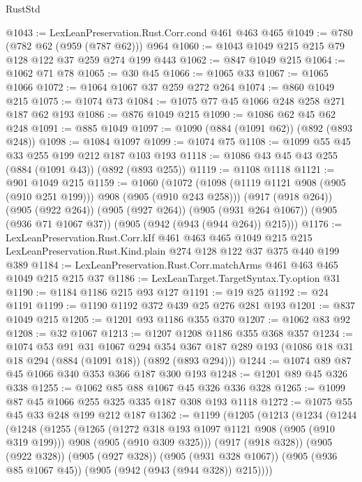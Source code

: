 \begin{lexlean}{RustStd}
\begin{coremodule}
@1043 := LexLeanPreservation.Rust.Corr.cond @461 @463 @465
@1049 := @780 (@782 @62 (@959 (@787 @62))) @964
@1060 := @1043 @1049 @215 @215 @79 @128 @122 @37 @259 @274 @199 @443
@1062 := @847 @1049 @215
@1064 := @1062 @71 @78
@1065 := @30 @45
@1066 := @1065 @33
@1067 := @1065 @1066
@1072 := @1064 @1067 @37 @259 @272 @264
@1074 := @860 @1049 @215
@1075 := @1074 @73
@1084 := @1075 @77 @45 @1066 @248 @258 @271 @187 @62 @193
@1086 := @876 @1049 @215
@1090 := @1086 @62 @45 @62 @248
@1091 := @885 @1049
@1097 := @1090 (@884 (@1091 @62)) (@892 (@893 @248))
@1098 := @1084 @1097
@1099 := @1074 @75
@1108 := @1099 @55 @45 @33 @255 @199 @212 @187 @103 @193
@1118 := @1086 @43 @45 @43 @255 (@884 (@1091 @43)) (@892 (@893 @255))
@1119 := @1108 @1118
@1121 := @901 @1049 @215
@1159 := @1060
    (@1072
      (@1098 (@1119 @1121 @908 (@905 (@910 @251 @199))) @908 (@905 (@910 @243 @258)))
      (@917 (@918 @264))
      (@905 (@922 @264))
      (@905 (@927 @264))
      (@905 (@931 @264 @1067))
      (@905 (@936 @71 @1067 @37))
      (@905 (@942 (@943 (@944 @264)) @215)))
@1176 := LexLeanPreservation.Rust.Corr.kIf
    @461
    @463
    @465
    @1049
    @215
    @215
    LexLeanPreservation.Rust.Kind.plain
    @274
    @128
    @122
    @37
    @375
    @440
    @199
    @389
@1184 := LexLeanPreservation.Rust.Corr.matchArms @461 @463 @465 @1049 @215 @215 @37
@1186 := LexLeanTarget.TargetSyntax.Ty.option @31
@1190 := @1184 @1186 @215 @93 @127
@1191 := @19 @25
@1192 := @24 @1191
@1199 := @1190 @1192 @372 @439 @25 @276 @281 @193
@1201 := @837 @1049 @215
@1205 := @1201 @93 @1186 @355 @370
@1207 := @1062 @83 @92
@1208 := @32 @1067
@1213 := @1207 @1208 @1186 @355 @368 @357
@1234 := @1074
    @53
    @91
    @31
    @1067
    @294
    @354
    @367
    @187
    @289
    @193
    (@1086 @18 @31 @18 @294 (@884 (@1091 @18)) (@892 (@893 @294)))
@1244 := @1074 @89 @87 @45 @1066 @340 @353 @366 @187 @300 @193
@1248 := @1201 @89 @45 @326 @338
@1255 := @1062 @85 @88 @1067 @45 @326 @336 @328
@1265 := @1099 @87 @45 @1066 @255 @325 @335 @187 @308 @193 @1118
@1272 := @1075 @55 @45 @33 @248 @199 @212 @187
@1362 := @1199
    (@1205
      (@1213
        (@1234
          (@1244
            (@1248
              (@1255
                (@1265
                  (@1272 @318 @193 @1097 @1121 @908 (@905 (@910 @319 @199)))
                  @908
                  (@905 (@910 @309 @325)))
                (@917 (@918 @328))
                (@905 (@922 @328))
                (@905 (@927 @328))
                (@905 (@931 @328 @1067))
                (@905 (@936 @85 @1067 @45))
                (@905 (@942 (@943 (@944 @328)) @215))))

\end{coremodule}
\end{lexlean}
